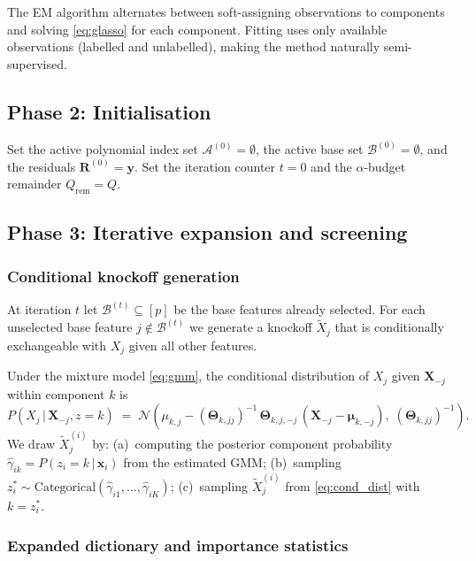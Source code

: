 \documentclass[11pt, a4paper]{article}
\newcommand{\N}{\mathcal{N}}
\newcommand{\calA}{\mathcal{A}}
\newcommand{\calB}{\mathcal{B}}
\newcommand{\cond}{\,|\,}
\newcommand{\Xb}{\mathbf{X}}
\newcommand{\xb}{\mathbf{x}}
\newcommand{\yb}{\mathbf{y}}
\newcommand{\Thetab}{\boldsymbol{\Theta}}
\newcommand{\mub}{\boldsymbol{\mu}}
\begin{document}
The EM algorithm alternates between soft-assigning observations to
components and solving \eqref{eq:glasso} for each component.  Fitting uses
only available observations (labelled and unlabelled), making the method
naturally semi-supervised.

\subsection{Phase 2: Initialisation}

Set the active polynomial index set $\calA^{(0)} = \emptyset$, the active
base set $\calB^{(0)} = \emptyset$, and the residuals
$\mathbf{R}^{(0)} = \yb$.  Set the iteration counter $t = 0$ and the
$\alpha$-budget remainder $Q_{\mathrm{rem}} = Q$.

\subsection{Phase 3: Iterative expansion and screening}
\label{sec:phase3}

\subsubsection{Conditional knockoff generation}
\label{sec:knockoff_gen}

At iteration $t$ let $\calB^{(t)} \subseteq [p]$ be the base features
already selected.  For each unselected base feature $j \notin \calB^{(t)}$
we generate a knockoff $\tilde X_j$ that is conditionally exchangeable with
$X_j$ given all other features.

Under the mixture model \eqref{eq:gmm}, the conditional distribution of
$X_j$ given $\Xb_{-j}$ within component $k$ is
\begin{equation}
  P(X_j \cond \Xb_{-j}, z=k)
  \;=\;
  \N\!\left(
    \mu_{k,j}
    - (\Thetab_{k,jj})^{-1}\,\Thetab_{k,j,-j}\,(\Xb_{-j} - \mub_{k,-j}),\;
    (\Thetab_{k,jj})^{-1}
  \right).
  \label{eq:cond_dist}
\end{equation}
We draw $\tilde X_j^{(i)}$ by: (a)~computing the posterior component
probability $\hat\gamma_{ik} = P(z_i = k \cond \xb_i)$ from the estimated
GMM; (b)~sampling $z_i^* \sim \mathrm{Categorical}(\hat\gamma_{i1}, \ldots,
\hat\gamma_{iK})$; (c)~sampling $\tilde X_j^{(i)}$ from
\eqref{eq:cond_dist} with $k = z_i^*$.

\subsubsection{Expanded dictionary and importance statistics}
\end{document}
